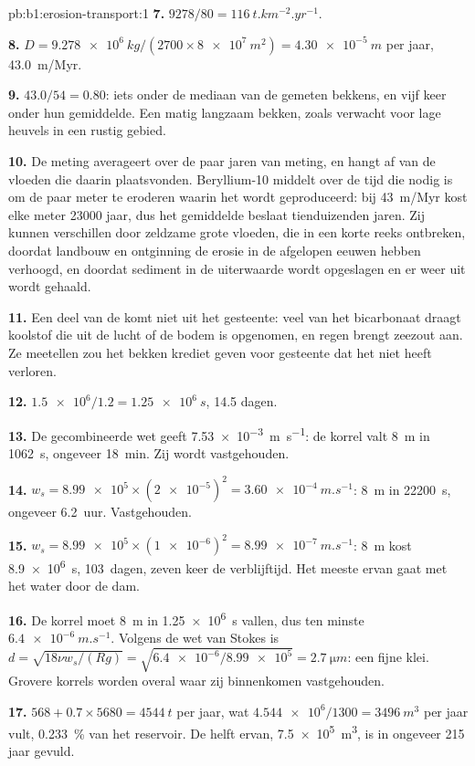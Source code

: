 \begin{solution}{pb:b1:erosion-transport:1}
\textbf{7.} $9278/80 = \qty{116}{t.km^{-2}.yr^{-1}}$.

\textbf{8.} $D = \qty{9.278e6}{kg}/(2700 \times \qty{8e7}{m^2}) =
\qty{4.30e-5}{m}$ per jaar, \qty{43.0}{m/Myr}.

\textbf{9.} $43.0/54 = 0.80$: iets onder de mediaan van de gemeten bekkens, en vijf keer
onder hun gemiddelde. Een matig langzaam bekken, zoals verwacht voor lage heuvels in een
rustig gebied.

\textbf{10.} De meting averageert over de paar jaren van meting, en hangt af van de
vloeden die daarin plaatsvonden. Beryllium-10 middelt over de tijd die nodig is om de paar
meter te eroderen waarin het wordt geproduceerd: bij \qty{43}{m/Myr} kost elke meter
\num{23000} jaar, dus het gemiddelde beslaat tienduizenden jaren. Zij kunnen verschillen
door zeldzame grote vloeden, die in een korte reeks ontbreken, doordat landbouw en
ontginning de erosie in de afgelopen eeuwen hebben verhoogd, en doordat sediment in de
uiterwaarde wordt opgeslagen en er weer uit wordt gehaald.

\textbf{11.} Een deel van de  komt niet uit het gesteente: veel van het
bicarbonaat draagt koolstof die uit de lucht of de bodem is opgenomen, en regen brengt
zeezout aan. Ze meetellen zou het bekken krediet geven voor gesteente dat het niet heeft verloren.

\textbf{12.} $\num{1.5e6}/1.2 = \qty{1.25e6}{s}$, \num{14.5} dagen.

\textbf{13.} De gecombineerde wet geeft \qty{7.53e-3}{m.s^{-1}}: de korrel valt
\qty{8}{m} in \qty{1062}{s}, ongeveer \qty{18}{min}. Zij wordt vastgehouden.

\textbf{14.} $w_s = \num{8.99e5} \times (\num{2e-5})^2 =
\qty{3.60e-4}{m.s^{-1}}$: \qty{8}{m} in \qty{22200}{s}, ongeveer \num{6.2}~uur.
Vastgehouden.

\textbf{15.} $w_s = \num{8.99e5} \times (\num{1e-6})^2 =
\qty{8.99e-7}{m.s^{-1}}$: \qty{8}{m} kost \qty{8.9e6}{s}, \num{103}~dagen, zeven keer de
verblijftijd. Het meeste ervan gaat met het water door de dam.

\textbf{16.} De korrel moet \qty{8}{m} in \qty{1.25e6}{s} vallen, dus ten minste
$\qty{6.4e-6}{m.s^{-1}}$. Volgens de wet van Stokes is $d = \sqrt{18\nu
w_s/(Rg)} = \sqrt{\num{6.4e-6}/\num{8.99e5}} = \qty{2.7}{\micro m}$: een fijne klei.
Grovere korrels worden overal waar zij binnenkomen vastgehouden.

\textbf{17.} $568 + 0.7 \times 5680 = \qty{4544}{t}$ per jaar, wat
$\num{4.544e6}/1300 = \qty{3496}{m^3}$ per jaar vult, \qty{0.233}{\percent} van het
reservoir. De helft ervan, \qty{7.5e5}{m^3}, is in ongeveer \num{215} jaar gevuld.


\end{solution}
